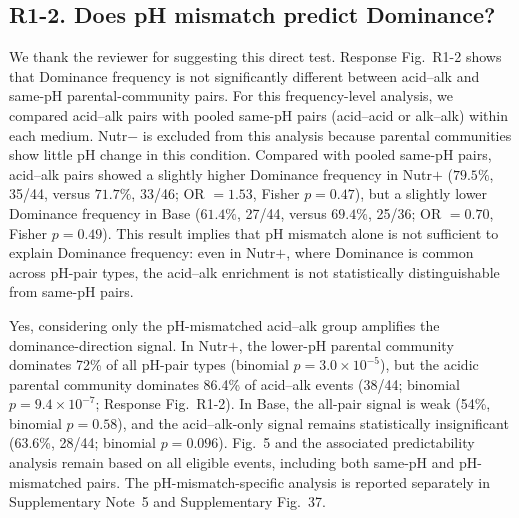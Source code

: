 \subsection*{R1-2. Does pH mismatch predict Dominance?}


\responselabel
We thank the reviewer for suggesting this direct test. Response Fig.~R1-2 shows that Dominance frequency is not significantly different between acid--alk and same-pH parental-community pairs. For this frequency-level analysis, we compared acid--alk pairs with pooled same-pH pairs (acid--acid or alk--alk) within each medium. Nutr$-$ is excluded from this analysis because parental communities show little pH change in this condition. Compared with pooled same-pH pairs, acid--alk pairs showed a slightly higher Dominance frequency in Nutr$+$ ($79.5\%$, 35/44, versus $71.7\%$, 33/46; OR $= 1.53$, Fisher $p = 0.47$), but a slightly lower Dominance frequency in Base ($61.4\%$, 27/44, versus $69.4\%$, 25/36; OR $= 0.70$, Fisher $p = 0.49$). This result implies that pH mismatch alone is not sufficient to explain Dominance frequency: even in Nutr$+$, where Dominance is common across pH-pair types, the acid--alk enrichment is not statistically distinguishable from same-pH pairs.


Yes, considering only the pH-mismatched acid--alk group amplifies the dominance-direction signal. In Nutr$+$, the lower-pH parental community dominates 72\% of all pH-pair types (binomial $p = 3.0 \times 10^{-5}$), but the acidic parental community dominates 86.4\% of acid--alk events (38/44; binomial $p = 9.4 \times 10^{-7}$; Response Fig.~R1-2). In Base, the all-pair signal is weak (54\%, binomial $p = 0.58$), and the acid--alk-only signal remains statistically insignificant (63.6\%, 28/44; binomial $p = 0.096$). Fig.~5 and the associated predictability analysis remain based on all eligible events, including both same-pH and pH-mismatched pairs. The pH-mismatch-specific analysis is reported separately in Supplementary Note~5 and Supplementary Fig.~37.

